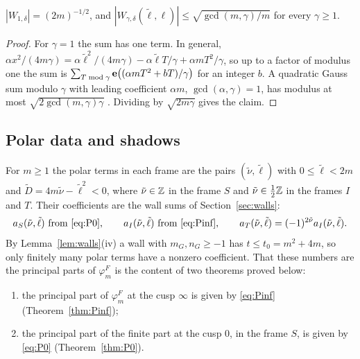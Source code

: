 \begin{lemma}\label{lem:weilbound}
$|W_{1,\delta}|=(2m)^{-1/2}$, and $|W_{\gamma,\delta}(\tilde\ell,\ell)|\le\sqrt{\gcd(m,\gamma)/m}$ for every $\gamma\ge1$.
\end{lemma}

\begin{proof}
For $\gamma=1$ the sum has one term. In general, $\alpha x^2/(4m\gamma)=\alpha\tilde\ell^2/(4m\gamma)-\alpha\tilde\ell T/\gamma+\alpha mT^2/\gamma$, so up to a factor of modulus one the sum is $\sum_{T\bmod\gamma}\mathbf e\big((\alpha mT^2+bT)/\gamma\big)$ for an integer $b$. A quadratic Gauss sum modulo $\gamma$ with leading coefficient $\alpha m$, $\gcd(\alpha,\gamma)=1$, has modulus at most $\sqrt{2\gcd(m,\gamma)\gamma}$ \cite[Chapter~1]{BEW98}. Dividing by $\sqrt{2m\gamma}$ gives the claim.
\end{proof}

\subsection{Polar data and shadows}
For $m\ge1$ the polar terms in each frame are the pairs $(\tilde\nu,\tilde\ell)$ with $0\le\tilde\ell<2m$ and $\tilde D=4m\tilde\nu-\tilde\ell^2<0$, where $\tilde\nu\in\mathbb{Z}$ in the frame $S$ and $\tilde\nu\in\frac12\mathbb{Z}$ in the frames $I$ and $T$. Their coefficients are the wall sums of Section~\ref{sec:walls}:
\begin{equation}\label{eq:polardata}
a_S(\tilde\nu,\tilde\ell)\ \text{from \eqref{eq:P0}},\qquad a_I(\tilde\nu,\tilde\ell)\ \text{from \eqref{eq:Pinf}},\qquad a_T(\tilde\nu,\tilde\ell)=(-1)^{2\tilde\nu}a_I(\tilde\nu,\tilde\ell).
\end{equation}
By Lemma~\ref{lem:walls}(iv) a wall with $m_G,n_G\ge-1$ has $t\le t_0=m^2+4m$, so only finitely many polar terms have a nonzero coefficient. That these numbers are the principal parts of $\varphi^F_m$ is the content of two theorems proved below:
\begin{enumerate}
\item[(P$\infty$)] the principal part of $\varphi^F_m$ at the cusp $\infty$ is given by \eqref{eq:Pinf} (Theorem~\ref{thm:Pinf});
\item[(P0)] the principal part of the finite part at the cusp $0$, in the frame $S$, is given by \eqref{eq:P0} (Theorem~\ref{thm:P0}).
\end{enumerate}

